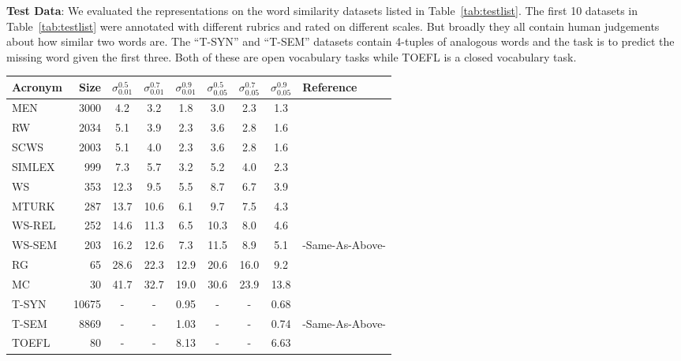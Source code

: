 \documentclass[11pt]{article}
\begin{document}
\noindent\textbf{Test Data}: We evaluated the representations on the
word similarity datasets listed in Table~\ref{tab:testlist}. The first
10 datasets in Table~\ref{tab:testlist} were annotated with different
rubrics and rated on different scales. But broadly they all
contain human judgements about how similar two words are.
The ``T-SYN'' and ``T-SEM'' datasets contain 4-tuples of
analogous words and the task is to predict the missing word given the
first three. Both of these are  open vocabulary tasks while TOEFL is a closed
vocabulary task. 
\begin{table*}[ht]
  \centering
  \begin{tabular}{lr | ccc  | ccc | l}
    Acronym & Size  &
    $\sigma_{0.01}^{0.5}$ & $\sigma_{0.01}^{0.7}$ & $\sigma_{0.01}^{0.9}$ &
    $\sigma_{0.05}^{0.5}$ & $\sigma_{0.05}^{0.7}$ & $\sigma_{0.05}^{0.9}$ &
    Reference  \\ 
    \hline

    MEN    & 3000  & 4.2  & 3.2  & 1.8  & 3.0  & 2.3  & 1.3  & \cite{bruni2012distributional}  \\
    RW     & 2034  & 5.1  & 3.9  & 2.3  & 3.6  & 2.8  & 1.6  & \cite{Luong2013morpho}          \\
    SCWS   & 2003  & 5.1  & 4.0  & 2.3  & 3.6  & 2.8  & 1.6  & \cite{Huang2012Improving}       \\
    SIMLEX & 999   & 7.3  & 5.7  & 3.2  & 5.2  & 4.0  & 2.3  & \cite{hill2014simlex}           \\
    WS     & 353   & 12.3 & 9.5  & 5.5  & 8.7  & 6.7  & 3.9  & \cite{finkelstein2001placing}   \\
    MTURK  & 287   & 13.7 & 10.6 & 6.1  & 9.7  & 7.5  & 4.3  & \cite{Radinsky2011word}         \\
    WS-REL & 252   & 14.6 & 11.3 & 6.5  & 10.3 & 8.0  & 4.6  & \cite{agirre2009study}          \\
    WS-SEM & 203   & 16.2 & 12.6 & 7.3  & 11.5 & 8.9  & 5.1  & -Same-As-Above-                 \\
    RG     & 65    & 28.6 & 22.3 & 12.9 & 20.6 & 16.0 & 9.2  & \cite{Rubenstein1965Contextual} \\
    MC     & 30    & 41.7 & 32.7 & 19.0 & 30.6 & 23.9 & 13.8 & \cite{miller1991contextual}     \\ \hline
    T-SYN  & 10675 & -    & -    & 0.95 & -    & -    & 0.68 & \cite{mikolov2013distributed}   \\
    T-SEM  & 8869  & -    & -    & 1.03 & -    & -    & 0.74 & -Same-As-Above-                 \\
    TOEFL  & 80    & -    & -    & 8.13 & -    & -    & 6.63 & \cite{landauer1997solution}
  \end{tabular}
  \caption{List of test datasets used. The columns headed $\sigma_{p_0}^r$ contain 
    \emph{MRDS}
    values. The rows for accuracy based test sets contain
    $\sigma_{p_0}$ which does not depend on $r$. See
    \S~\ref{ssec:mdrs} for details.}
   \label{tab:testlist}
\end{table*}
\end{document}
